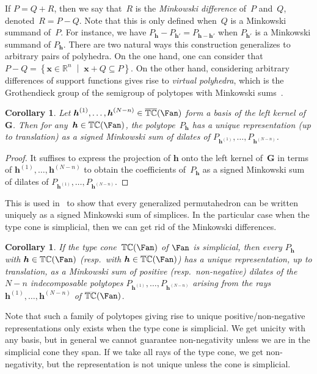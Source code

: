 \documentclass{amsart}
\newtheorem{corollary}[theorem]{Corollary}
\theoremstyle{definition}
\newcommand{\R}{\mathbb{R}} %
\renewcommand{\b}[1]{{\boldsymbol{#1}}} %
\newcommand{\set}[2]{\left\{ #1 \;\middle|\; #2 \right\}} %
\newcommand{\darkblue}{\color{darkblue}} %
\newcommand{\defn}[1]{\textsl{\darkblue #1}} %
\newcommand{\typeCone}{\mathbb{TC}} %
\newcommand{\ctypeCone}{\smash{\overline{\mathbb{TC}}}} %
\begin{document}
If $P = Q + R$, then we say that~$R$ is the \defn{Minkowski difference} of~$P$ and~$Q$, denoted~${R = P - Q}$. Note that this is only defined when~$Q$ is a Minkowski summand of~$P$.
For instance, we have ${P_\b{h} - P_{\b{h}'} = P_{\b{h} - \b{h'}}}$ when $P_{\b{h}'}$ is a Minkowski summand of $P_\b{h}$.
There are two natural ways this construction generalizes to arbitrary pairs of polyhedra.
On the one hand, one can consider that ${P - Q = \set{\b{x} \in \R^n}{\b{x} + Q \subseteq P}}$.
On the other hand, considering arbitrary differences of support functions gives rise to \defn{virtual polyhedra}, which is the Grothendieck group of the semigroup of polytopes with Minkowski sums~\cite{PukhlikovKhovanskii}.

\begin{corollary}
Let $\b{h}^{(1)},\dots, \b{h}^{(N-n)} \in \ctypeCone(\Fan)$ form a basis of the left kernel of~$\b{G}$. Then for any~$\b{h} \in \ctypeCone(\Fan)$, the polytope~$P_\b{h}$ has a unique representation (up to translation) as a signed Minkowski sum of dilates of $P_{\b{h}^{(1)}}, \dots, P_{\b{h}^{(N-n)}}$.
\end{corollary}

\begin{proof}
It suffises to express the projection of $\b{h}$ onto the left kernel of~$\b{G}$ in terms of $\b{h}^{(1)}, \dots, \b{h}^{(N-n)}$ to obtain the coefficients of~$P_\b{h}$ as a signed Minkowski sum of dilates of $P_{\b{h}^{(1)}}, \dots, P_{\b{h}^{(N-n)}}$.
\end{proof}

This is used in~\cite{ArdilaBenedettiDoker} to show that every generalized permutahedron can be written uniquely as a signed Minkowski sum of simplices. 
In the particular case when the type cone is simplicial, then we can get rid of the Minkowski differences.

\begin{corollary}
If the type cone~$\typeCone(\Fan)$ of $\Fan$ is simplicial, then every $P_\b{h}$ with $\b{h} \in \typeCone(\Fan)$ (resp.~with $\b{h} \in \ctypeCone(\Fan)$) has a unique representation, up to translation, as a Minkowski sum of positive (resp.~non-negative) dilates of the $N-n$ indecomposable polytopes $P_{\b{h}^{(1)}}, \dots, P_{\b{h}^{(N-n)}}$ arising from the rays~$\b{h}^{(1)}, \dots, \b{h}^{(N-n)}$ of $\ctypeCone(\Fan)$.
\end{corollary}

Note that such a family of polytopes giving rise to unique positive/non-negative representations only exists when the type cone is simplicial. We get unicity with any basis, but in general we cannot guarantee non-negativity unless we are in the simplicial cone they span. If we take all rays of the type cone, we get non-negativity, but the representation is not unique unless the cone is simplicial.
\end{document}
